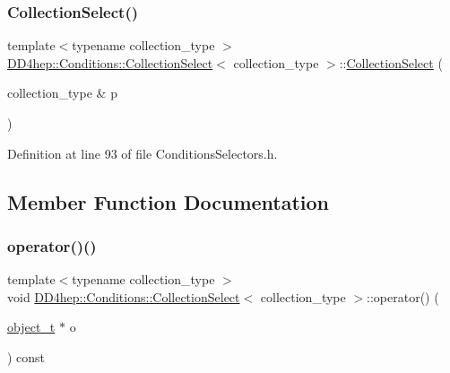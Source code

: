 \subsubsection{\texorpdfstring{Collection\+Select()}{CollectionSelect()}}
{\footnotesize\ttfamily template$<$typename collection\+\_\+type $>$ \\
\hyperlink{class_d_d4hep_1_1_conditions_1_1_collection_select}{D\+D4hep\+::\+Conditions\+::\+Collection\+Select}$<$ collection\+\_\+type $>$\+::\hyperlink{class_d_d4hep_1_1_conditions_1_1_collection_select}{Collection\+Select} (\begin{DoxyParamCaption}\item[{collection\+\_\+type \&}]{p }\end{DoxyParamCaption})\hspace{0.3cm}{\ttfamily [inline]}}



Definition at line 93 of file Conditions\+Selectors.\+h.



\subsection{Member Function Documentation}
\hypertarget{class_d_d4hep_1_1_conditions_1_1_collection_select_a9c34ccb3f513f59eaceda89c9ab1bf0c}{}\label{class_d_d4hep_1_1_conditions_1_1_collection_select_a9c34ccb3f513f59eaceda89c9ab1bf0c} 
\subsubsection{\texorpdfstring{operator()()}{operator()()}\hspace{0.1cm}{\footnotesize\ttfamily [1/4]}}
{\footnotesize\ttfamily template$<$typename collection\+\_\+type $>$ \\
void \hyperlink{class_d_d4hep_1_1_conditions_1_1_collection_select}{D\+D4hep\+::\+Conditions\+::\+Collection\+Select}$<$ collection\+\_\+type $>$\+::operator() (\begin{DoxyParamCaption}\item[{\hyperlink{class_d_d4hep_1_1_conditions_1_1_cond_____oper_a4229491e49bfd21058dff10125a73f63}{object\+\_\+t} $\ast$}]{o }\end{DoxyParamCaption}) const\hspace{0.3cm}{\ttfamily [inline]}}



